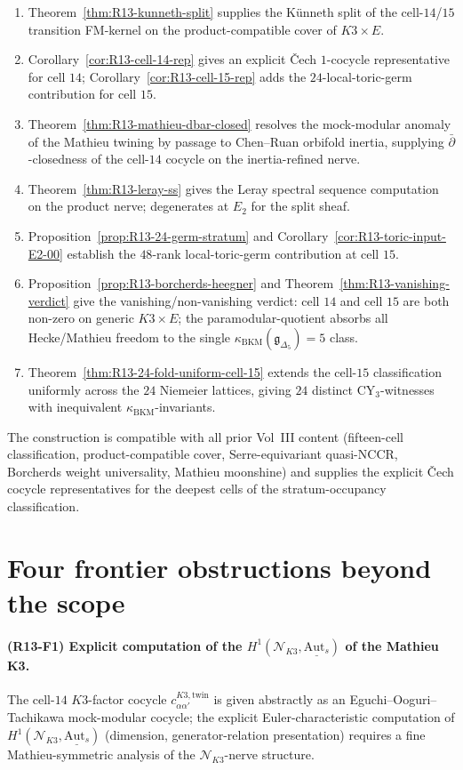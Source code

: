 \documentclass[11pt]{amsart}
\providecommand{\kBKM}{\kappa_{\mathrm{BKM}}}
\providecommand{\Aut}{\mathrm{Aut}}
\providecommand{\cN}{\mathcal{N}}
\begin{document}
\begin{enumerate}[leftmargin=2em]
\item Theorem~\ref{thm:R13-kunneth-split} supplies the K\"{u}nneth split
of the cell-$14$/$15$ transition FM-kernel on the product-compatible
cover of $K3 \times E$.
\item Corollary~\ref{cor:R13-cell-14-rep} gives an explicit \v{C}ech
$1$-cocycle representative for cell $14$; Corollary~\ref{cor:R13-cell-15-rep}
adds the $24$-local-toric-germ contribution for cell $15$.
\item Theorem~\ref{thm:R13-mathieu-dbar-closed} resolves the
mock-modular anomaly of the Mathieu twining by passage to Chen--Ruan
orbifold inertia, supplying $\bar\partial$-closedness of the cell-$14$
cocycle on the inertia-refined nerve.
\item Theorem~\ref{thm:R13-leray-ss} gives the Leray spectral sequence
computation on the product nerve; degenerates at $E_2$ for the split
sheaf.
\item Proposition~\ref{prop:R13-24-germ-stratum} and Corollary~\ref{cor:R13-toric-input-E2-00}
establish the $48$-rank local-toric-germ contribution at cell $15$.
\item Proposition~\ref{prop:R13-borcherds-heegner} and
Theorem~\ref{thm:R13-vanishing-verdict} give the vanishing/non-vanishing
verdict: cell $14$ and cell $15$ are both non-zero on generic
$K3 \times E$; the paramodular-quotient absorbs all Hecke/Mathieu
freedom to the single $\kBKM(\mathfrak{g}_{\Delta_5}) = 5$ class.
\item Theorem~\ref{thm:R13-24-fold-uniform-cell-15} extends the cell-$15$
classification uniformly across the $24$ Niemeier lattices, giving
$24$ distinct CY$_3$-witnesses with inequivalent $\kBKM$-invariants.
\end{enumerate}

The construction is compatible with all prior Vol~III content
(fifteen-cell classification, product-compatible cover,
Serre-equivariant quasi-NCCR, Borcherds weight universality, Mathieu
moonshine) and supplies the explicit \v{C}ech cocycle representatives
for the deepest cells of the stratum-occupancy classification.

\section*{Four frontier obstructions beyond the scope}

\paragraph{(R13-F1) Explicit computation of the $H^1(\cN_{K3}, \underline{\Aut_s})$
of the Mathieu K3.} The cell-$14$ $K3$-factor cocycle
$c^{K3, \mathrm{twin}}_{\alpha \alpha'}$ is given abstractly as an
Eguchi--Ooguri--Tachikawa mock-modular cocycle; the explicit Euler-characteristic
computation of $H^1(\cN_{K3}, \underline{\Aut_s})$ (dimension,
generator-relation presentation) requires a fine Mathieu-symmetric
analysis of the $\cN_{K3}$-nerve structure.
\end{document}
